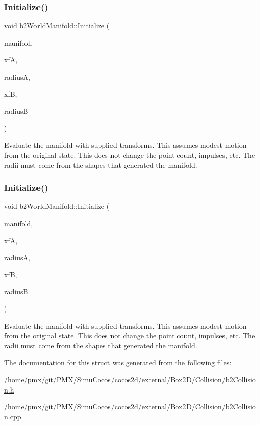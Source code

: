 \subsubsection{\texorpdfstring{Initialize()}{Initialize()}\hspace{0.1cm}{\footnotesize\ttfamily [1/2]}}
{\footnotesize\ttfamily void b2\+World\+Manifold\+::\+Initialize (\begin{DoxyParamCaption}\item[{const \hyperlink{structb2Manifold}{b2\+Manifold} $\ast$}]{manifold,  }\item[{const \hyperlink{structb2Transform}{b2\+Transform} \&}]{xfA,  }\item[{float32}]{radiusA,  }\item[{const \hyperlink{structb2Transform}{b2\+Transform} \&}]{xfB,  }\item[{float32}]{radiusB }\end{DoxyParamCaption})}

Evaluate the manifold with supplied transforms. This assumes modest motion from the original state. This does not change the point count, impulses, etc. The radii must come from the shapes that generated the manifold. \mbox{\label{structb2WorldManifold_a896dd7e7d4d6f6a5bc69e19fbd6871bd}} 
\subsubsection{\texorpdfstring{Initialize()}{Initialize()}\hspace{0.1cm}{\footnotesize\ttfamily [2/2]}}
{\footnotesize\ttfamily void b2\+World\+Manifold\+::\+Initialize (\begin{DoxyParamCaption}\item[{const \hyperlink{structb2Manifold}{b2\+Manifold} $\ast$}]{manifold,  }\item[{const \hyperlink{structb2Transform}{b2\+Transform} \&}]{xfA,  }\item[{float32}]{radiusA,  }\item[{const \hyperlink{structb2Transform}{b2\+Transform} \&}]{xfB,  }\item[{float32}]{radiusB }\end{DoxyParamCaption})}

Evaluate the manifold with supplied transforms. This assumes modest motion from the original state. This does not change the point count, impulses, etc. The radii must come from the shapes that generated the manifold. 

The documentation for this struct was generated from the following files\+:\begin{DoxyCompactItemize}
\item 
/home/pmx/git/\+P\+M\+X/\+Simu\+Cocos/cocos2d/external/\+Box2\+D/\+Collision/\hyperlink{cocos2d_2external_2Box2D_2Collision_2b2Collision_8h}{b2\+Collision.\+h}\item 
/home/pmx/git/\+P\+M\+X/\+Simu\+Cocos/cocos2d/external/\+Box2\+D/\+Collision/b2\+Collision.\+cpp\end{DoxyCompactItemize}
